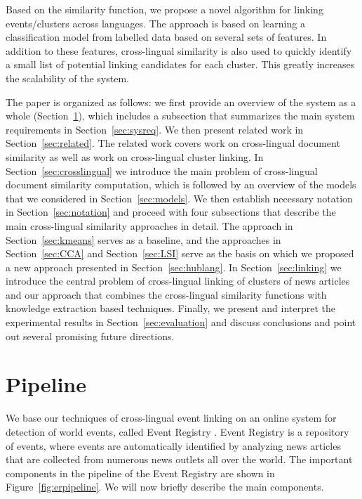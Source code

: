 \documentclass[twoside,11pt]{article}
\begin{document}
Based on the similarity function, we propose a novel algorithm for linking events/clusters across languages. The approach is based on learning a classification model from labelled data based on several sets of features. In addition to these features, cross-lingual similarity is also used to quickly identify a small list of potential linking candidates for each cluster.
This greatly increases the scalability of the system.

The paper is organized as follows: we first provide an overview of the system as a whole (Section~\ref{sec:pipeline}), which includes a subsection that summarizes the main system requirements in Section~\ref{sec:sysreq}. We then present related work in Section~\ref{sec:related}. The related work covers work on cross-lingual document similarity as well as work on cross-lingual cluster linking. In Section~\ref{sec:crosslingual} we introduce the main problem of cross-lingual document similarity computation, which is followed by an overview of the models that we considered in Section~\ref{sec:models}. We then establish necessary notation in Section~\ref{sec:notation} and proceed with four subsections that describe the main cross-lingual similarity approaches in detail. The approach in Section~\ref{sec:kmeans} serves as a baseline, and the approaches in Section~\ref{sec:CCA} and Section~\ref{sec:LSI} serve as the basis on which we proposed a new approach presented in Section~\ref{sec:hublang}. In Section~\ref{sec:linking} we introduce the central problem of cross-lingual linking of clusters of news articles and our approach that combines the cross-lingual similarity functions with knowledge extraction based techniques. Finally, we present and interpret the experimental results in Section~\ref{sec:evaluation} and discuss conclusions and point out several promising future directions.


\section{Pipeline}\label{sec:pipeline}

We base our techniques of cross-lingual event linking on an online system for detection of world events, called Event Registry . Event Registry is a repository of events, where events are automatically identified by analyzing news articles that are collected from numerous news outlets all over the world. The important components in the pipeline of the Event Registry are shown in Figure~\ref{fig:erpipeline}. We will now briefly describe the main components.
\end{document}
